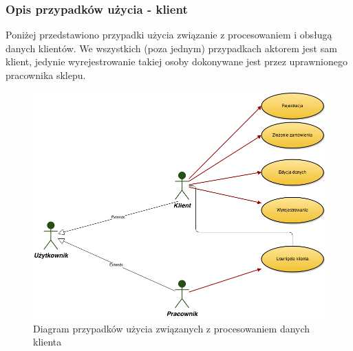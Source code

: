 \subsubsection{Opis przypadków użycia - klient}



Poniżej przedstawiono przypadki użycia związanie z procesowaniem i obsługą
danych klientów. We wszystkich (poza jednym) przypadkach aktorem jest sam
klient, jedynie wyrejestrowanie takiej osoby dokonywane jest przez uprawnionego
pracownika sklepu.



\begin{figure}[h!]
    \includegraphics[width=\textwidth,
    height=0.5\textheight]{graphics/UseCase/Klient/UseCaseDiagram.png}
  \caption{Diagram przypadków użycia związanych z procesowaniem danych klienta}
\end{figure}





\newpage
\begin{enumerate}
  
  
  
  
  
\end{enumerate} 
 

